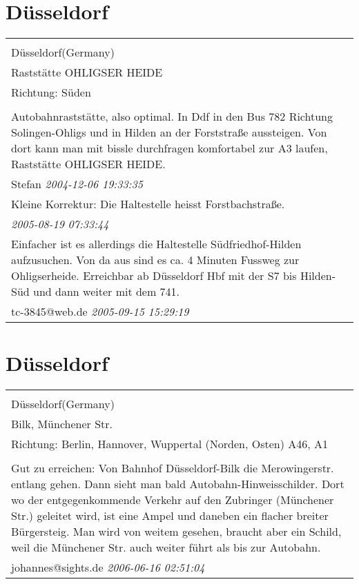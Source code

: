 \documentclass[a4paper,12pt]{article}
\begin{document}
\section{Düsseldorf}
\begin{tabular}{|p{13cm}|}
\hline\\
Düsseldorf(Germany)\\
Raststätte OHLIGSER HEIDE\\
Richtung: Süden \\
\hline\\
Autobahnraststätte, also optimal. In Ddf in den Bus 782 Richtung Solingen-Ohligs und in Hilden an der Forststraße aussteigen. Von dort kann man mit bissle durchfragen komfortabel zur A3 laufen, Raststätte OHLIGSER HEIDE. \\
Stefan \textit{ 2004-12-06 19:33:35 }\\\hline Kleine Korrektur: Die Haltestelle heisst Forstbachstraße. \\
\textit{ 2005-08-19 07:33:44 }\\\hline Einfacher ist es allerdings die Haltestelle Südfriedhof-Hilden aufzusuchen. Von da aus sind es ca. 4 Minuten Fussweg zur Ohligserheide. Erreichbar ab Düsseldorf Hbf mit der S7 bis Hilden-Süd und dann weiter mit dem 741. \\
tc-3845@web.de \textit{ 2005-09-15 15:29:19 }\\\hline
\end{tabular}


\section{Düsseldorf}
\begin{tabular}{|p{13cm}|}
\hline\\
Düsseldorf(Germany)\\
Bilk, Münchener Str.\\
Richtung: Berlin, Hannover, Wuppertal (Norden, Osten) A46, A1 \\
\hline\\
Gut zu erreichen: Von Bahnhof Düsseldorf-Bilk die Merowingerstr. entlang gehen. Dann sieht man bald Autobahn-Hinweisschilder. Dort wo der entgegenkommende Verkehr auf den Zubringer (Münchener Str.) geleitet wird, ist eine Ampel und daneben ein flacher breiter Bürgersteig. Man wird von weitem gesehen, braucht aber ein Schild, weil die Münchener Str. auch weiter führt als bis zur Autobahn. \\
johannes@sights.de \textit{ 2006-06-16 02:51:04 }\\\hline
\end{tabular}
\end{document}
